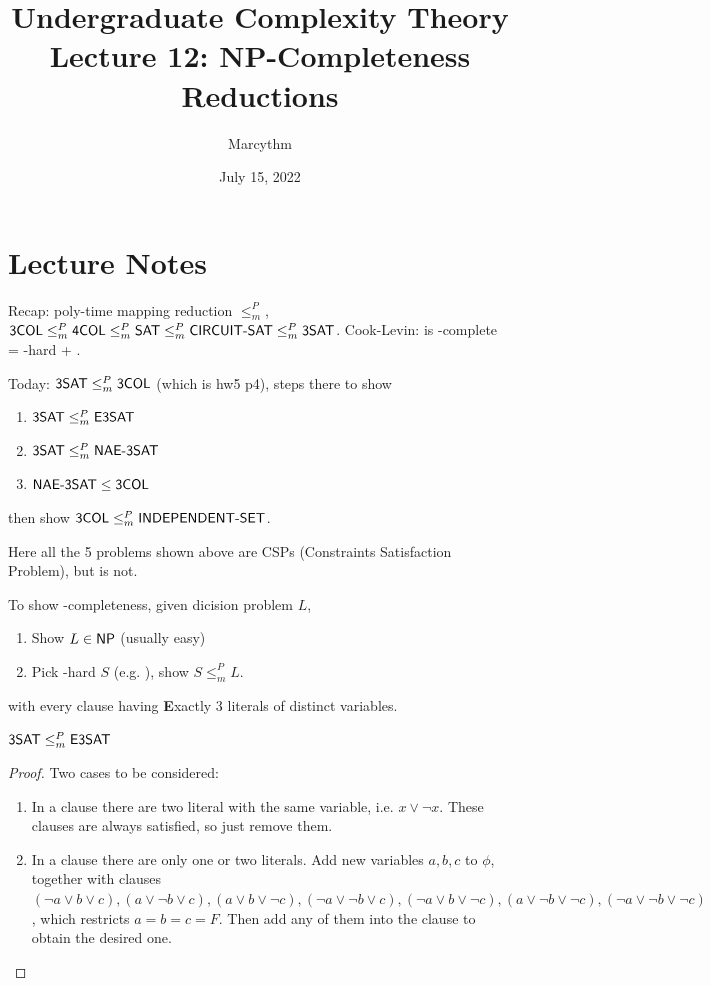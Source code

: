 \documentclass{article}
\title{Undergraduate Complexity Theory \\ Lecture 12: NP-Completeness Reductions}
\author{Marcythm}
\date{July 15, 2022}
\begin{document}
\maketitle{}

\section{Lecture Notes}

Recap: poly-time mapping reduction \(\leq_m^P\), \( \text{\sf 3COL} \leq_m^P \text{\sf 4COL} \leq_m^P \text{\sf SAT} \leq_m^P \text{\sf CIRCUIT-SAT} \leq_m^P \text{\sf 3SAT} \). Cook-Levin:  is \NP-complete = \NP-hard + \NP.

Today: \(\text{\sf 3SAT} \leq_m^P \text{\sf 3COL}\) (which is hw5 p4), steps there to show
\begin{enumerate}
  \item \( \text{\sf 3SAT} \leq_m^P \text{\sf E3SAT} \)
  \item \( \text{\sf 3SAT} \leq_m^P \text{\sf NAE-3SAT} \)
  \item \( \text{\sf NAE-3SAT} \leq \text{\sf 3COL} \)
\end{enumerate}

then show \(\text{\sf 3COL} \leq_m^P \text{\sf INDEPENDENT-SET}\).

\begin{remark}
  Here all the 5 problems shown above are CSPs (Constraints Satisfaction Problem), but  is not.
\end{remark}

To show \NP-completeness, given dicision problem \(L\),
\begin{enumerate}
  \item Show \(L \in \text{\sf NP}\) (usually easy)
  \item Pick \NP-hard \(S\) (e.g. ), show \(S \leq_m^P L\).
\end{enumerate}

\begin{definition}
   with every clause having {\bf E}xactly 3 literals of distinct variables.
\end{definition}

\begin{theorem}
  \( \text{\sf 3SAT} \leq_m^P \text{\sf E3SAT} \)
\end{theorem}

\begin{proof}
  Two cases to be considered:
  \begin{enumerate}
    \item In a clause there are two literal with the same variable, i.e. \(x \vee \neg x\). These clauses are always satisfied, so just remove them.
    \item In a clause there are only one or two literals. Add new variables \(a, b, c\) to \(\phi\), together with clauses \( (\neg a \vee b \vee c), (a \vee \neg b \vee c), (a \vee b \vee \neg c), (\neg a \vee \neg b \vee c), (\neg a \vee b \vee \neg c), (a \vee \neg b \vee \neg c), (\neg a \vee \neg b \vee \neg c) \), which restricts \(a = b = c = F\). Then add any of them into the clause to obtain the desired one.
  \end{enumerate}
\end{proof}
\end{document}
